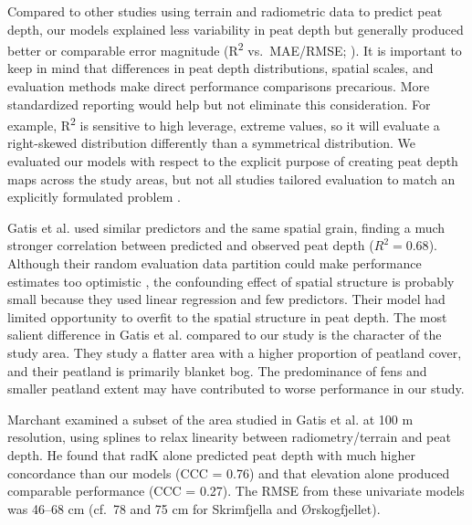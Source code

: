 \documentclass[soil, manuscript]{copernicus}
\begin{document}
Compared to other studies using terrain and radiometric data to predict peat depth, our models explained less variability in peat depth but generally produced better or comparable error magnitude (R\textsuperscript{2} vs.~MAE/RMSE; \citet{wadouxIntegratedApproachEvaluation2022}).
It is important to keep in mind that differences in peat depth distributions, spatial scales, and evaluation methods make direct performance comparisons precarious.
More standardized reporting would help but not eliminate this consideration.
For example, R\textsuperscript{2} is sensitive to high leverage, extreme values, so it will evaluate a right-skewed distribution differently than a symmetrical distribution.
We evaluated our models with respect to the explicit purpose of creating peat depth maps across the study areas, but not all studies tailored evaluation to match an explicitly formulated problem \citep{milaNearestNeighbourDistance2022}.

Gatis et al. \citeyearpar{gatisMappingUplandPeat2019} used similar predictors and the same spatial grain, finding a much stronger correlation between predicted and observed peat depth (\(R^2 = 0.68\)).
Although their random evaluation data partition could make performance estimates too optimistic \citep{robertsCrossvalidationStrategiesData2017, wadouxSpatialCrossvalidationNot2021}, the confounding effect of spatial structure is probably small because they used linear regression and few predictors.
Their model had limited opportunity to overfit to the spatial structure in peat depth.
The most salient difference in Gatis et al. \citeyearpar{gatisMappingUplandPeat2019} compared to our study is the character of the study area.
They study a flatter area with a higher proportion of peatland cover, and their peatland is primarily blanket bog.
The predominance of fens and smaller peatland extent may have contributed to worse performance in our study.

Marchant \citeyearpar{marchantUsingRemoteSensors2021} examined a subset of the area studied in Gatis et al. \citeyearpar{gatisMappingUplandPeat2019} at 100 m resolution, using splines to relax linearity between radiometry/terrain and peat depth.
He found that radK alone predicted peat depth with much higher concordance than our models (CCC = 0.76) and that elevation alone produced comparable performance (CCC = 0.27).
The RMSE from these univariate models was 46--68 cm (cf.~78 and 75 cm for Skrimfjella and Ørskogfjellet).
\end{document}

